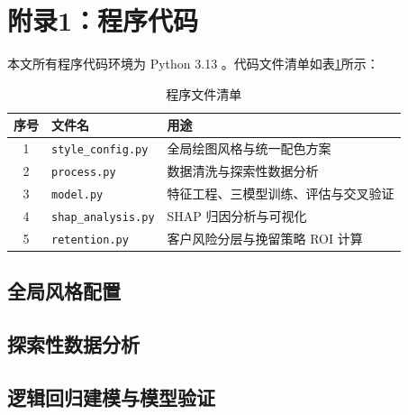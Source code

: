 \section{附录1：程序代码}

本文所有程序代码环境为 Python 3.13 。代码文件清单如表\ref{tab:code_files}所示：

\begin{table}[htbp]
    \centering
    \caption{程序文件清单}
    \label{tab:code_files}
    \small
    \begin{tabular}{clp{7cm}}
        \toprule
        序号 & 文件名 & 用途 \\
        \midrule
        1 & \texttt{style\_config.py}   & 全局绘图风格与统一配色方案 \\
        2 & \texttt{process.py}         & 数据清洗与探索性数据分析 \\
        3 & \texttt{model.py}           & 特征工程、三模型训练、评估与交叉验证 \\
        4 & \texttt{shap\_analysis.py}  & SHAP 归因分析与可视化 \\
        5 & \texttt{retention.py}       & 客户风险分层与挽留策略 ROI 计算 \\
        \bottomrule
    \end{tabular}
\end{table}

\subsection*{全局风格配置}


\subsection*{探索性数据分析}


\subsection*{逻辑回归建模与模型验证}


